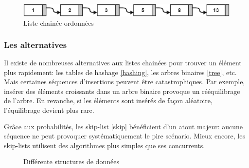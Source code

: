 \documentclass[hidelinks,a4paper, 12pt]{article}
\begin{document}
	\begin{figure}[h]
		\includegraphics[width=\textwidth]{img/linkedList}
		\caption{Liste chainée ordonnées}
		\label{LinkedList}
	\end{figure}
	
	\subsubsection*{Les alternatives}
	Il existe de nombreuses alternatives aux listes chainées pour trouver un élément plus rapidement: les tables de hashage \cref{hashing}, les arbres binaires \cref{tree}, etc. Mais certaines séquences d'insertions peuvent être catastrophiques. Par exemple, insérer des éléments croissants dans un arbre binaire provoque un rééquilibrage de l'arbre. En revanche, si les éléments sont insérés de façon aléatoire, l'équilibrage devient plus rare.

	Grâce aux probabilités, les \og skip-list \fg{} \cref{skip} bénéficient d'un atout majeur: aucune séquence ne peut provoquer systématiquement le pire scénario. Mieux encore, les skip-lists utilisent des algorithmes plus simples que ses concurrents.
	
	\begin{figure}[h]
		\centering
		\caption{Différente structures de données}
	\end{figure}
	
\end{document}
